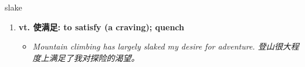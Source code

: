 
\begin{frame}
{\huge slake}
\begin{center}
\begin{enumerate}\Large
  \item \textbf{vt. 使满足: to satisfy (a craving); quench}
  \begin{itemize}
    \item \em{\Large{Mountain climbing has largely slaked my desire for adventure. 登山很大程度上满足了我对探险的渴望。}}
  \end{itemize}
\end{enumerate}
\end{center}
\end{frame}
